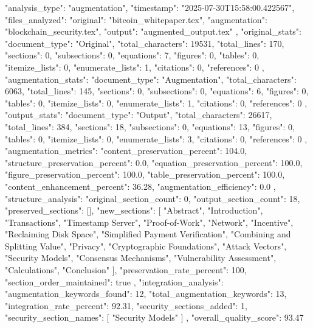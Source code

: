 {
  "analysis_type": "augmentation",
  "timestamp": "2025-07-30T15:58:00.422567",
  "files_analyzed": {
    "original": "bitcoin_whitepaper.tex",
    "augmentation": "blockchain_security.tex",
    "output": "augmented_output.tex"
  },
  "original_stats": {
    "document_type": "Original",
    "total_characters": 19531,
    "total_lines": 170,
    "sections": 0,
    "subsections": 0,
    "equations": 7,
    "figures": 0,
    "tables": 0,
    "itemize_lists": 0,
    "enumerate_lists": 1,
    "citations": 0,
    "references": 0
  },
  "augmentation_stats": {
    "document_type": "Augmentation",
    "total_characters": 6063,
    "total_lines": 145,
    "sections": 0,
    "subsections": 0,
    "equations": 6,
    "figures": 0,
    "tables": 0,
    "itemize_lists": 0,
    "enumerate_lists": 1,
    "citations": 0,
    "references": 0
  },
  "output_stats": {
    "document_type": "Output",
    "total_characters": 26617,
    "total_lines": 384,
    "sections": 18,
    "subsections": 0,
    "equations": 13,
    "figures": 0,
    "tables": 0,
    "itemize_lists": 0,
    "enumerate_lists": 3,
    "citations": 0,
    "references": 0
  },
  "augmentation_metrics": {
    "content_preservation_percent": 104.0,
    "structure_preservation_percent": 0.0,
    "equation_preservation_percent": 100.0,
    "figure_preservation_percent": 100.0,
    "table_preservation_percent": 100.0,
    "content_enhancement_percent": 36.28,
    "augmentation_efficiency": 0.0
  },
  "structure_analysis": {
    "original_section_count": 0,
    "output_section_count": 18,
    "preserved_sections": [],
    "new_sections": [
      "Abstract",
      "Introduction",
      "Transactions",
      "Timestamp Server",
      "Proof-of-Work",
      "Network",
      "Incentive",
      "Reclaiming Disk Space",
      "Simplified Payment Verification",
      "Combining and Splitting Value",
      "Privacy",
      "Cryptographic Foundations",
      "Attack Vectors",
      "Security Models",
      "Consensus Mechanisms",
      "Vulnerability Assessment",
      "Calculations",
      "Conclusion"
    ],
    "preservation_rate_percent": 100,
    "section_order_maintained": true
  },
  "integration_analysis": {
    "augmentation_keywords_found": 12,
    "total_augmentation_keywords": 13,
    "integration_rate_percent": 92.31,
    "security_sections_added": 1,
    "security_section_names": [
      "Security Models"
    ]
  },
  "overall_quality_score": 93.47
}